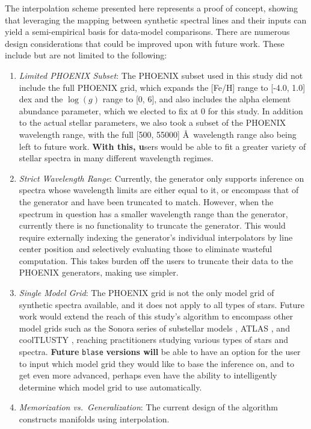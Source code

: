 \documentclass[twocolumn, linenumbers]{aastex631}
\begin{document}
The interpolation scheme presented here represents a proof of concept, showing that leveraging the mapping between synthetic spectral lines and their inputs can yield a semi-empirical basis for data-model comparisons.
There are numerous design considerations that could be improved upon with future work.
These include but are not limited to the following:
\begin{enumerate}[label=-]
    \item \textit{Limited PHOENIX Subset}: The PHOENIX subset used in this study did not include the full PHOENIX grid, which expands the [Fe/H] range to [-4.0, 1.0] dex and the $\log(g)$ range to [0, 6], and also includes the alpha element abundance parameter, which we elected to fix at 0 for this study.
    In addition to the actual stellar parameters, we also took a subset of the PHOENIX wavelength range, with the full [500, 55000] \AA \ wavelength range also being left to future work.
    \textbf{With this, u}sers would be able to fit a greater variety of stellar spectra in many different wavelength regimes.
    \item \textit{Strict Wavelength Range}: Currently, the generator only supports inference on spectra whose wavelength limits are either equal to it, or encompass that of the generator and have been truncated to match.
    However, when the spectrum in question has a smaller wavelength range than the generator, currently there is no functionality to truncate the generator.
    This would require externally indexing the generator's individual interpolators by line center position and selectively evaluating those to eliminate wasteful computation.
    This takes burden off the users to truncate their data to the PHOENIX generators, making use simpler.
    \item \textit{Single Model Grid}: The PHOENIX grid is not the only model grid of synthetic spectra available, and it does not apply to all types of stars.
    Future work would extend the reach of this study's algorithm to encompass other model grids such as the Sonora series of substellar models \textbf{\citep{bobcat, cholla, diamondback, elfowl}}, ATLAS \citep{atlas}, and coolTLUSTY \citep{coolTLUSTY}, reaching practitioners studying various types of stars and spectra.
    \textbf{Future} \texttt{blase} \textbf{versions will} be able to have an option for the user to input which model grid they would like to base the inference on, and to get even more advanced, perhaps even have the ability to intelligently determine which model grid to use automatically.
    \item \textit{Memorization vs.\ Generalization}: The current design of the algorithm constructs manifolds using interpolation.

\end{enumerate}
\end{document}
